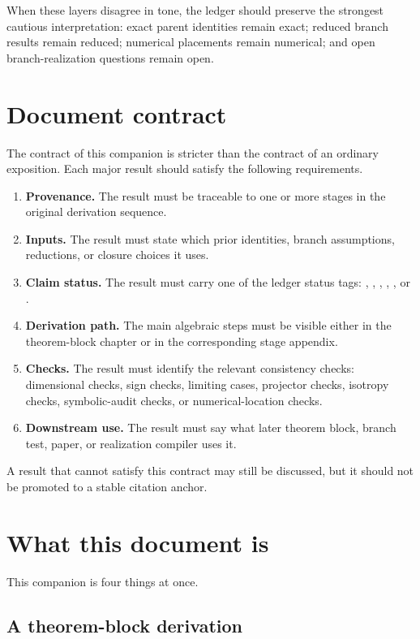 When these layers disagree in tone, the ledger should preserve the strongest cautious interpretation: exact parent identities remain exact; reduced branch results remain reduced; numerical placements remain numerical; and open branch-realization questions remain open.

\section{Document contract}

The contract of this companion is stricter than the contract of an ordinary exposition.  Each major result should satisfy the following requirements.

\begin{enumerate}[leftmargin=2.2em]
  \item \textbf{Provenance.}  The result must be traceable to one or more stages in the original derivation sequence.
  \item \textbf{Inputs.}  The result must state which prior identities, branch assumptions, reductions, or closure choices it uses.
  \item \textbf{Claim status.}  The result must carry one of the ledger status tags: \StatusExact, \StatusExactClosure, \StatusReduced, \StatusEffective, \StatusNumerical, or \StatusOpen.
  \item \textbf{Derivation path.}  The main algebraic steps must be visible either in the theorem-block chapter or in the corresponding stage appendix.
  \item \textbf{Checks.}  The result must identify the relevant consistency checks: dimensional checks, sign checks, limiting cases, projector checks, isotropy checks, symbolic-audit checks, or numerical-location checks.
  \item \textbf{Downstream use.}  The result must say what later theorem block, branch test, paper, or realization compiler uses it.
\end{enumerate}

A result that cannot satisfy this contract may still be discussed, but it should not be promoted to a stable citation anchor.

\section{What this document is}

This companion is four things at once.

\subsection{A theorem-block derivation}

